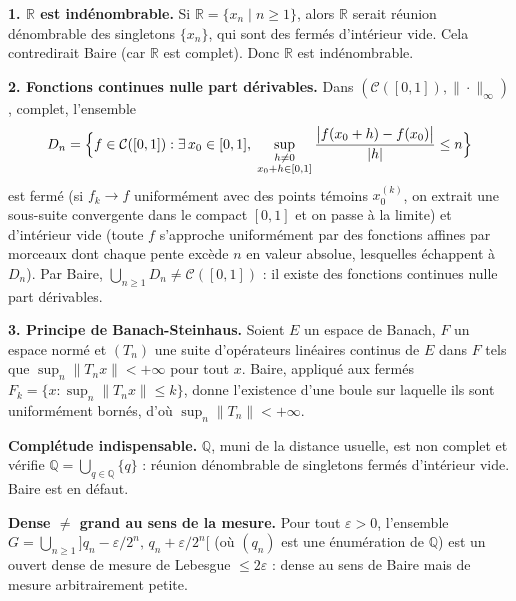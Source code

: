 \decsep{}



\begin{mdframed}[style=exbar]
  \textbf{1. $\mathbb{R}$ est indénombrable.}
  Si $\mathbb{R} = \{x_n \mid n \geq 1\}$, alors $\mathbb{R}$ serait réunion
  dénombrable des singletons $\{x_n\}$, qui sont des fermés d'intérieur vide.
  Cela contredirait Baire (car $\mathbb{R}$ est complet). Donc $\mathbb{R}$
  est indénombrable.

  \smallskip\noindent
  \textbf{2. Fonctions continues nulle part dérivables.}
  Dans $(\mathcal{C}([0,1]), \|\cdot\|_\infty)$, complet, l'ensemble
  \[
    D_n = \Bigl\{f \in \mathcal{C}([0,1]) : \exists\, x_0\in[0,1],\;
    \sup_{\substack{h\neq 0\\ x_0+h\in[0,1]}}
    \frac{\bigl|f(x_0+h)-f(x_0)\bigr|}{|h|} \leq n\Bigr\}
  \]
  est fermé (si $f_k \to f$ uniformément avec des points témoins $x_0^{(k)}$,
  on extrait une sous-suite convergente dans le compact $[0,1]$ et on passe à
  la limite) et d'intérieur vide (toute $f$ s'approche uniformément par des
  fonctions affines par morceaux dont chaque pente excède $n$ en valeur
  absolue, lesquelles échappent à $D_n$).
  Par Baire, $\bigcup_{n\geq 1} D_n \neq \mathcal{C}([0,1])$ :
  il existe des fonctions continues nulle part dérivables.

  \smallskip\noindent
  \textbf{3. Principe de Banach-Steinhaus.}
  Soient $E$ un espace de Banach, $F$ un espace normé et $(T_n)$ une suite
  d'opérateurs linéaires continus de $E$ dans $F$
  tels que $\sup_n \|T_n x\| < +\infty$ pour tout $x$. Baire, appliqué aux
  fermés $F_k = \{x : \sup_n \|T_n x\| \leq k\}$, donne l'existence d'une
  boule sur laquelle ils sont uniformément bornés, d'où $\sup_n \|T_n\| < +\infty$.
\end{mdframed}


\begin{mdframed}[style=cexbar]
  \textbf{Complétude indispensable.}\enspace%
  $\mathbb{Q}$, muni de la distance usuelle, est non complet et vérifie
  $\mathbb{Q} = \bigcup_{q \in \mathbb{Q}} \{q\}$ : réunion dénombrable de
  singletons fermés d'intérieur vide. Baire est en défaut.

  \smallskip\noindent
  \textbf{Dense $\neq$ grand au sens de la mesure.}\enspace%
  Pour tout $\varepsilon > 0$, l'ensemble
  $G = \bigcup_{n \geq 1} \bigl]q_n - \varepsilon/2^n,\, q_n + \varepsilon/2^n\bigr[$
  (où $(q_n)$ est une énumération de $\mathbb{Q}$) est un ouvert dense
  de mesure de Lebesgue $\leq 2\varepsilon$ : dense au sens de Baire mais
  de mesure arbitrairement petite.
\end{mdframed}

